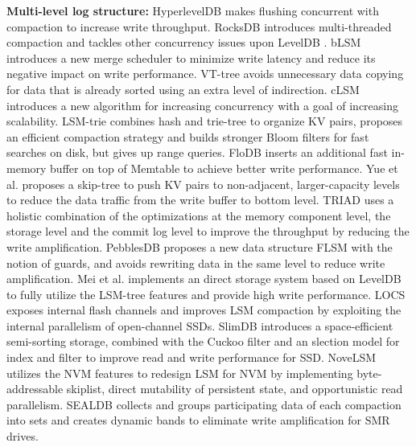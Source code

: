 \documentclass[sigconf]{acmart}
\begin{document}
\textbf{Multi-level log structure:} HyperlevelDB \cite{HyperLevelDB} makes flushing concurrent with compaction to increase write throughput. RocksDB \cite{RocksDB} introduces multi-threaded compaction and tackles other concurrency issues upon LevelDB \cite{LevelDB}. bLSM \cite{bLSM} introduces a new merge scheduler to minimize write latency and reduce its negative impact on write performance. VT-tree \cite{VTtree} avoids unnecessary data copying for data that is already sorted using an extra level of indirection. cLSM \cite{cLSM} introduces a new algorithm for increasing concurrency with a goal of increasing scalability. LSM-trie \cite{LSMtrie} combines hash and trie-tree to organize KV pairs, proposes an efficient compaction strategy and builds stronger Bloom filters for fast searches on disk, but gives up range queries. FloDB \cite{FloDB} inserts an additional fast in-memory buffer on top of Memtable to achieve better write performance. Yue et al. \cite{skiptree} proposes a skip-tree to push KV pairs to non-adjacent, larger-capacity levels to reduce the data traffic from the write buffer to bottom level. TRIAD \cite{TRIAD} uses a holistic combination of the optimizations at the memory component level, the storage level and the commit log level to improve the throughput by reducing the write amplification. PebblesDB \cite{PebblesDB} proposes a new data structure FLSM with the notion of guards, and avoids rewriting data in the same level to reduce write amplification. Mei et al. \cite{LDS} implements an direct storage system based on LevelDB to fully utilize the LSM-tree features and provide high write performance. LOCS\cite{LOCS} exposes internal flash channels and improves LSM compaction by exploiting the internal parallelism of open-channel SSDs. SlimDB \cite{SlimDB} introduces a space-efficient semi-sorting storage, combined with the Cuckoo filter and an slection model for index and filter to improve read and write performance for SSD. NoveLSM \cite{NoveLSM} utilizes the NVM features to redesign LSM for NVM by implementing byte-addressable skiplist, direct mutability of persistent state, and opportunistic read parallelism. SEALDB \cite{SEALDB} collects and groups participating data of each compaction into sets and creates dynamic bands to eliminate write amplification for SMR drives. {}
\end{document}
